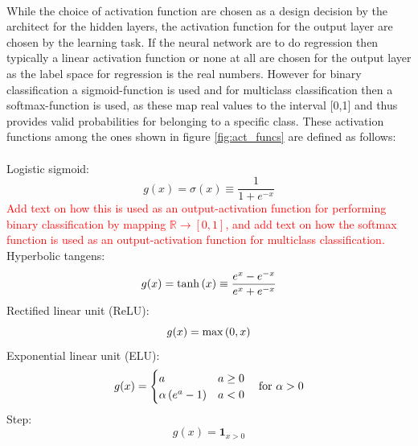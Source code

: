 \\
While the choice of activation function are chosen as a design decision by the architect for the hidden layers, the activation function for the output layer are chosen by the learning task. If the neural network are to do regression then typically a linear activation function or none at all are chosen for the output layer as the label space for regression is the real numbers. However for binary classification a sigmoid-function is used and for multiclass classification then a softmax-function is used, as these map real values to the interval [0,1] and thus provides valid probabilities for belonging to a specific class. These activation functions among the ones shown in figure \ref{fig:act_funcs} are defined as follows:\\
\\
Logistic sigmoid:
\begin{equation*}
    g(x) = \sigma(x) \equiv \frac{1}{1 + e^{-x}}
\end{equation*}
\textcolor{red}{Add text on how this is used as an output-activation function for performing binary classification by mapping $\mathbb{R} \rightarrow [0,1]$, and add text on how the softmax function is used as an output-activation function for multiclass classification.}\\
Hyperbolic tangens:
\begin{equation*}
    g(x) = \tanh \left (x\right) \equiv \frac{e^x - e^{-x}}{e^x + e^{-x}}
\end{equation*}
Rectified linear unit (ReLU):
\begin{equation} \label{eq:relu}
    g(x) = \max \left (0, x\right)
\end{equation}
Exponential linear unit (ELU):
\begin{equation*}
    g(x) = \begin{cases}
    a & a \geq 0 \\
    \alpha \left (e^a - 1\right) & a < 0
    \end{cases} \quad \text{for } \alpha > 0
\end{equation*}
Step:
\begin{equation*}
    g(x) = \mathbf{1}_{x > 0}
\end{equation*}



